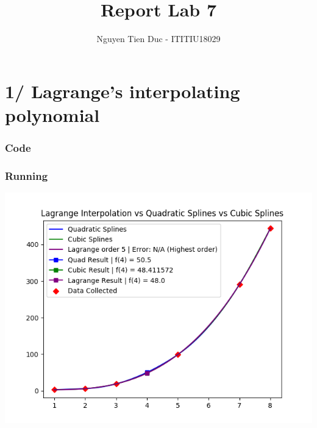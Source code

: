 \documentclass[12pt]{article}
\begin{document}
  \title{Report Lab 7}
  \author{Nguyen Tien Duc - ITITIU18029}
  \maketitle
  \part*{1/ Lagrange's interpolating polynomial}
    \section*{Code}
    \section*{Running}
      \begin{center}
          \includegraphics{Result0.png}
      \end{center}
\end{document}
